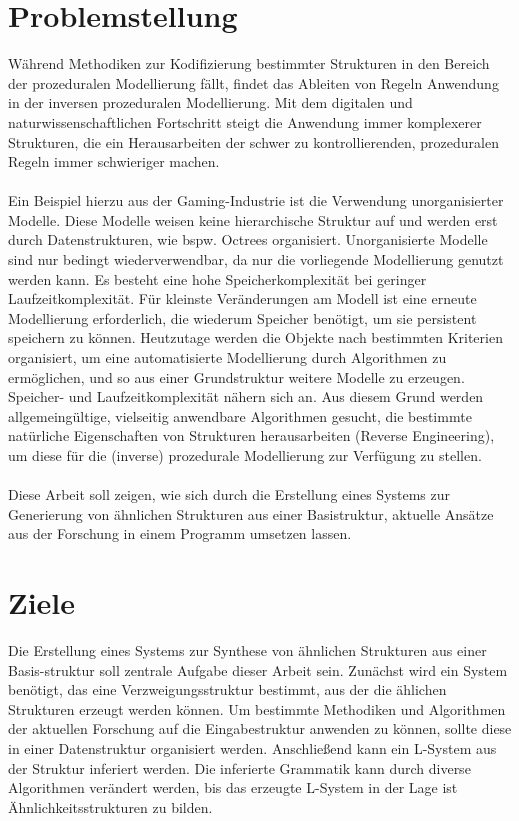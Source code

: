 \section{Problemstellung}
Während Methodiken zur Kodifizierung bestimmter Strukturen in den Bereich der prozeduralen Modellierung fällt,
findet das Ableiten von Regeln Anwendung in der inversen prozeduralen Modellierung.
Mit dem digitalen und naturwissenschaftlichen Fortschritt steigt die Anwendung immer komplexerer Strukturen, die
ein Herausarbeiten der schwer zu kontrollierenden, prozeduralen Regeln immer schwieriger machen.
\\~\\
Ein Beispiel hierzu aus der Gaming-Industrie ist die Verwendung unorganisierter Modelle.
Diese Modelle weisen keine hierarchische Struktur auf und werden erst durch Datenstrukturen, wie bspw. Octrees organisiert.
Unorganisierte Modelle sind nur bedingt wiederverwendbar, da nur die vorliegende Modellierung genutzt werden kann.
Es besteht eine hohe Speicherkomplexität bei geringer Laufzeitkomplexität.
Für kleinste Veränderungen am Modell ist eine erneute Modellierung erforderlich, die wiederum Speicher benötigt, um sie
persistent speichern zu können.
Heutzutage werden die Objekte nach bestimmten Kriterien organisiert, um eine automatisierte Modellierung durch Algorithmen
zu ermöglichen, und so aus einer Grundstruktur weitere Modelle zu erzeugen.
Speicher- und Laufzeitkomplexität nähern sich an.
Aus diesem Grund werden allgemeingültige, vielseitig anwendbare Algorithmen gesucht, die bestimmte natürliche Eigenschaften
von Strukturen herausarbeiten (Reverse Engineering), um diese für die (inverse) prozedurale Modellierung zur
Verfügung zu stellen.
\\~\\
Diese Arbeit soll zeigen, wie sich durch die Erstellung eines Systems zur Generierung von ähnlichen Strukturen aus einer
Basistruktur, aktuelle Ansätze aus der Forschung in einem Programm umsetzen lassen.

\newpage

\section{Ziele}
Die Erstellung eines Systems zur Synthese von ähnlichen Strukturen aus einer Basis-struktur soll zentrale Aufgabe dieser
Arbeit sein.
Zunächst wird ein System benötigt, das eine Verzweigungsstruktur bestimmt, aus der die ählichen Strukturen erzeugt
werden können.
Um bestimmte Methodiken und Algorithmen der aktuellen Forschung auf die Eingabestruktur anwenden zu können, sollte diese
in einer Datenstruktur organisiert werden.
Anschließend kann ein L-System aus der Struktur inferiert werden.
Die inferierte Grammatik kann durch diverse Algorithmen verändert werden, bis das erzeugte L-System in der Lage ist
Ähnlichkeitsstrukturen zu bilden.

